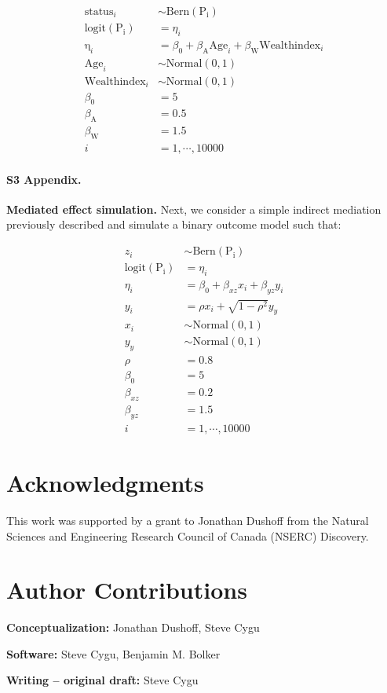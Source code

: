 \begin{align}\label{sim:glm_two_pred}
\mathrm{status}_i &\sim \mathrm{Bern}(\mathrm{P_i}) \nonumber\\
\mathrm{logit}(\mathrm{P_i}) &= \eta_i \nonumber\\
\mathrm{\eta}_i &= \beta_0 + \beta_{\mathrm{A}}\mathrm{Age}_i + \beta_{\mathrm{W}}\mathrm{Wealthindex}_i \nonumber\\
\mathrm{Age}_i &\sim \mathrm{Normal}(0, 1) \nonumber\\
\mathrm{Wealthindex}_i &\sim \mathrm{Normal}(0, 1) \nonumber\\
\beta_0 &= 5 \nonumber\\
\beta_{\mathrm{A}} &= 0.5 \nonumber\\
\beta_{\mathrm{W}} &= 1.5 \nonumber\\
i &= 1,\cdots, 10000
\end{align}

\paragraph*{S3 Appendix.}
\label{S3_Appendix}
{\bf Mediated effect simulation.} Next, we consider a simple indirect mediation previously described and simulate a binary outcome model such that:

\begin{align}\label{sim:simple_mediate}
z_i &\sim \mathrm{Bern}(\mathrm{P_i}) \nonumber\\
\mathrm{logit}(\mathrm{P_i}) &= \eta_i \nonumber\\
\eta_i &= \beta_0 + \beta_{xz} x_i + \beta_{yz} y_i \nonumber\\
y_i &= \rho x_i + \sqrt{1-\rho^2} y_y \nonumber\\
x_i &\sim \mathrm{Normal(0, 1)} \nonumber\\
y_y &\sim \mathrm{Normal(0, 1)} \nonumber\\
\rho &= 0.8 \nonumber\\
\beta_0 &= 5 \nonumber\\
\beta_{xz} &= 0.2 \nonumber\\
\beta_{yz} &= 1.5 \nonumber\\
i &= 1,\cdots, 10000
\end{align}


\section*{Acknowledgments}

This work was supported by a grant to Jonathan Dushoff from the Natural Sciences and Engineering Research Council of Canada (NSERC) Discovery.

\section*{Author Contributions}

\textbf{Conceptualization:} Jonathan Dushoff, Steve Cygu

\noindent\textbf{Software:} Steve Cygu, Benjamin M. Bolker

\noindent\textbf{Writing – original draft:} Steve Cygu

\nolinenumbers
